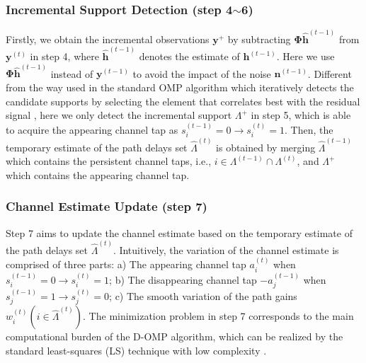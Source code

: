 \documentclass[conference]{IEEEtran}
\begin{document}
\subsubsection{Incremental Support Detection (step 4$\sim$6)}
Firstly, we obtain the incremental observations $\mathbf{y}^{+}$ by subtracting $\mathbf{\Phi}\hat{\mathbf{h}}^{(t-1)}$ from $\mathbf{y}^{(t)}$ in step 4, where $\hat{\mathbf{h}}^{(t-1)}$ denotes the estimate of $\mathbf{h}^{(t-1)}$.
Here we use $\mathbf{\Phi}\hat{\mathbf{h}}^{(t-1)}$ instead of $\mathbf{y}^{(t-1)}$ to avoid the impact of the noise $\mathbf{n}^{(t-1)}$.
Different from the way used in the standard OMP algorithm which iteratively detects the candidate supports by selecting the element that correlates best with the residual signal \cite{StandardOMP}, here we only detect the incremental support $\Lambda^{+}$ in step 5, which is able to acquire the appearing channel tap as $s_i^{(t-1)}=0\rightarrow s_i^{(t)}=1$.
Then, the temporary estimate of the path delays set $\hat{\Lambda}^{(t)}$ is obtained by merging $\hat{\Lambda}^{(t-1)}$ which contains the persistent channel taps, i.e., $i\in\Lambda^{(t-1)}\cap\Lambda^{(t)}$, and $\Lambda^{+}$ which contains the appearing channel tap.

\subsubsection{Channel Estimate Update (step 7)}
Step 7 aims to update the channel estimate based on the temporary estimate of the path delays set $\hat{\Lambda}^{(t)}$.
Intuitively, the variation of the channel estimate is comprised of three parts: a) The appearing channel tap $a_i^{(t)}$ when $s_i^{(t-1)}=0\rightarrow s_i^{(t)}=1$; b) The disappearing channel tap $-a_j^{(t-1)}$ when $s_j^{(t-1)}=1\rightarrow s_j^{(t)}=0$; c) The smooth variation of the path gains $w_i^{(t)}(i\in\hat{\Lambda}^{(t)})$.
The minimization problem in step 7 corresponds to the main computational burden of the D-OMP algorithm, which can be realized by the standard least-squares (LS) technique with low complexity \cite{GS}.
\end{document}
